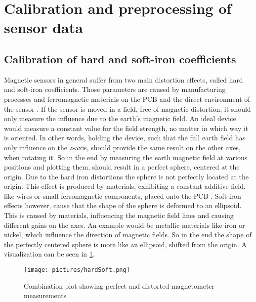 \section{Calibration and preprocessing of sensor data}

\subsection{Calibration of hard and soft-iron coefficients}

Magnetic sensors in general suffer from two main distortion effects, called hard and soft-iron coefficients. Those parameters are caused by manufacturing processes and ferromagnetic materials on the \ac{PCB} and the direct environment of the sensor \cite{ozyagcilar2012calibrating}. If the sensor is moved in a field, free of magnetic distortion, it should only measure the influence due to the earth's magnetic field. An ideal device would measure a constant value for the field strength, no matter in which way it is oriented. In other words, holding the device, such that the full earth field has only influence on the $ z $-axis, should provide the same result on the other axes, when rotating it. So in the end by measuring the earth magnetic field at various positions and plotting them, should result in a perfect sphere, centered at the origin. Due to the hard iron distortions the sphere is not perfectly located at the origin. This effect is produced by materials, exhibiting a constant additive field, like wires or small ferromagnetic components, placed onto the PCB . Soft iron effects however, cause that the shape of the sphere is deformed to an ellipsoid. This is caused by materials, influencing the magnetic field lines and causing different gains on the axes. An example would be metallic materials like iron or nickel, which influence the direction of magnetic fields. So in the end the shape of the perfectly centered sphere is more like an ellipsoid, shifted from the origin. A visualization can be seen in \ref{fig:hardSoft}.

\begin{figure}
\centering
\texttt{[image: pictures/hardSoft.png]}
\caption{Combination plot showing perfect and distorted magnetometer measurements \cite{ozyagcilar2012calibrating}}
\label{fig:hardSoft}
\end{figure}

